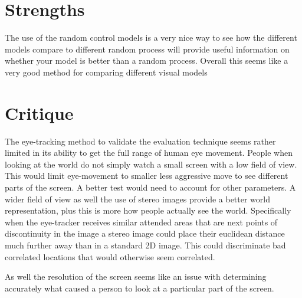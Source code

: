 \documentclass{article}
\begin{document}
\section*{Strengths}
The use of the random control models is a very nice way to see how the different models compare to different random process will provide useful information on whether your model is better than a random process. Overall this seems like a very good method for comparing different visual models
\section*{Critique}
The eye-tracking method to validate the evaluation technique seems rather limited in its ability to get the full range of human eye movement. People when looking at the world do not simply watch a small screen with a low field of view. This would limit eye-movement to smaller less aggressive move to see different parts of the screen. A better test would need to account for other parameters. A wider field of view as well the use of stereo images provide a better world representation, plus this is more how people actually see the world. Specifically when the eye-tracker receives similar attended areas that are next points of discontinuity in the image a stereo image could place their euclidean distance much further away than in a standard 2D image. This could discriminate bad correlated locations that would otherwise seem correlated.

As well the resolution of the screen seems like an issue with determining accurately what caused a person to look at a particular part of the screen.
\cite{citation}
\end{document}

